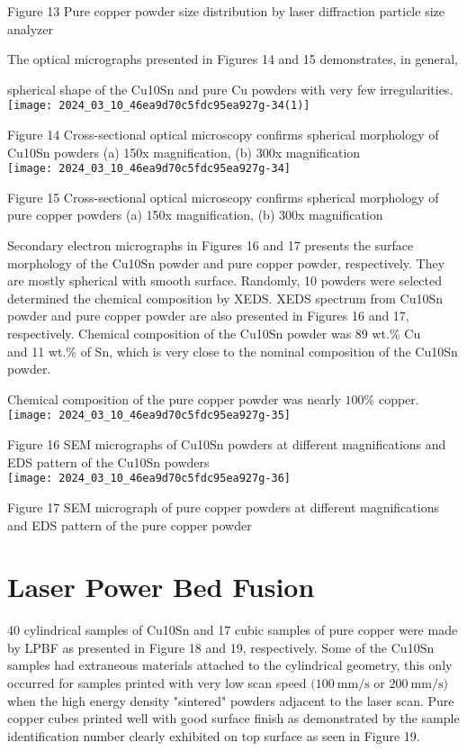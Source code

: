 \documentclass[10pt]{article}
\begin{document}
Figure 13 Pure copper powder size distribution by laser diffraction particle size analyzer

The optical micrographs presented in Figures 14 and 15 demonstrates, in general,

spherical shape of the Cu10Sn and pure Cu powders with very few irregularities.\\
\texttt{[image: 2024\_03\_10\_46ea9d70c5fdc95ea927g-34(1)]}

Figure 14 Cross-sectional optical microscopy confirms spherical morphology of Cu10Sn powders (a) 150x magnification, (b) 300x magnification\\
\texttt{[image: 2024\_03\_10\_46ea9d70c5fdc95ea927g-34]}

Figure 15 Cross-sectional optical microscopy confirms spherical morphology of pure copper powders (a) 150x magnification, (b) 300x magnification

Secondary electron micrographs in Figures 16 and 17 presents the surface morphology of the Cu10Sn powder and pure copper powder, respectively. They are mostly spherical with smooth surface. Randomly, 10 powders were selected determined the chemical composition by XEDS. XEDS spectrum from Cu10Sn powder and pure copper powder are also presented in Figures 16 and 17, respectively. Chemical composition of the Cu10Sn powder was 89 wt.\% Cu\\
and 11 wt.\% of Sn, which is very close to the nominal composition of the Cu10Sn powder.

Chemical composition of the pure copper powder was nearly $100 \%$ copper.\\
\texttt{[image: 2024\_03\_10\_46ea9d70c5fdc95ea927g-35]}

Figure 16 SEM micrographs of Cu10Sn powders at different magnifications and EDS pattern of the Cu10Sn powders\\
\texttt{[image: 2024\_03\_10\_46ea9d70c5fdc95ea927g-36]}

Figure 17 SEM micrograph of pure copper powders at different magnifications and EDS pattern of the pure copper powder

\section*{Laser Power Bed Fusion}
40 cylindrical samples of Cu10Sn and 17 cubic samples of pure copper were made by LPBF as presented in Figure 18 and 19, respectively. Some of the Cu10Sn samples had extraneous materials attached to the cylindrical geometry, this only occurred for samples printed with very low scan speed $(100 \mathrm{~mm} / \mathrm{s}$ or $200 \mathrm{~mm} / \mathrm{s})$ when the high energy density "sintered" powders adjacent to the laser scan. Pure copper cubes printed well with good surface finish as demonstrated by the sample identification number clearly exhibited on top surface as seen in Figure 19.
\end{document}
